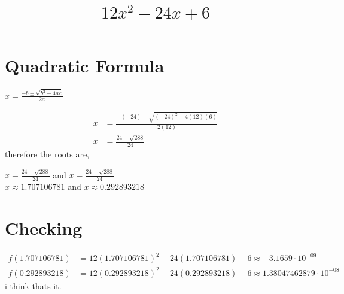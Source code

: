 \documentclass{article}
\date{}
\author{}
\title{$12x^2-24x+6$}
\begin{document}
    \maketitle
    \section*{Quadratic Formula}
    \begin{center}
        $x=\frac{-b\pm\sqrt{b^2-4ac}}{2a}$
    \end{center}
    \begin{align*}
        x&=\frac{-(-24)\pm\sqrt{(-24)^2-4(12)(6)}}{2(12)}\\
        x&=\frac{24\pm\sqrt{288}}{24}
    \end{align*}
    therefore the roots are,
    \begin{center}
        $x=\frac{24+\sqrt{288}}{24}$ and $x=\frac{24-\sqrt{288}}{24}$\\
        $x\approx1.707106781$ and $x\approx0.292893218$
    \end{center}
    \section*{Checking}
    \begin{align*}
        f(1.707106781)&=12(1.707106781)^2-24(1.707106781)+6\approx -3.1659\cdot 10^{-09}\\
        f(0.292893218)&=12(0.292893218)^2-24(0.292893218)+6\approx 1.38047462879\cdot 10^{-08}
    \end{align*}
    i think thats it.
\end{document}

